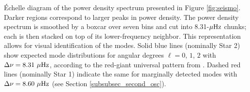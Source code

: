 \label{fig:echelle} \'Echelle diagram of the power density spectrum presented in Figure \ref{fig:seismo}. Darker regions correspond to larger peaks in power density. The power density spectrum is smoothed by a boxcar over seven bins and cut into 8.31-$\mu\rm{Hz}$ chunks; each is then stacked on top of its lower-frequency neighbor. This representation allows for visual identification of the modes. Solid blue lines (nominally Star 2) show expected mode distributions for angular degrees $\ell = 0$, $1$, $2$ with $\Delta\nu = 8.31\ \mu\rm{Hz}$, according to the red-giant universal pattern from \citet{mos11}. Dashed red lines (nominally Star 1) indicate the same for marginally detected modes with $\Delta\nu = 8.60\ \mu\rm{Hz}$ (see Section \ref{subsubsec_second_osc}).

  